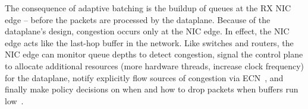 The consequence of adaptive batching is the buildup of queues at the
RX NIC edge -- before the packets are processed by the dataplane.
Because of the dataplane's design, congestion occurs only at the NIC
edge.  
In effect, the NIC edge acts like the last-hop
buffer in the network.  Like switches and routers, the NIC edge can
monitor queue depths to detect congestion, signal the control plane to
allocate additional resources (more hardware threads, increase clock
frequency) for the dataplane, notify explicitly flow sources of
congestion via ECN~\cite{ramakrishnan2001addition}, and finally make
policy decisions on when and how to drop packets when buffers run
low~\cite{DBLP:journals/ton/FloydJ93}.
